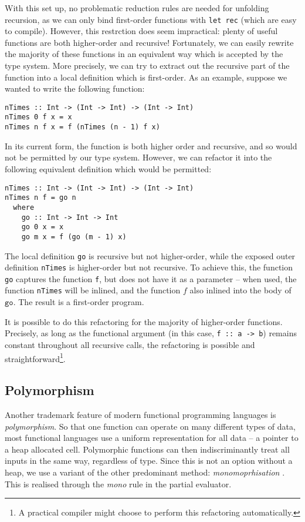 \documentclass[runningheads]{llncs}
\begin{document}
With this set up, no problematic reduction rules are needed for unfolding recursion, as we can only bind first-order functions with \texttt{let rec} (which are easy to compile). However, this restrction does seem impractical: plenty of useful functions are both higher-order and recursive! Fortunately, we can easily rewrite the majority of these functions in an equivalent way which is accepted by the type system. More precisely, we can try to extract out the recursive part of the function into a local definition which is first-order. As an example, suppose we wanted to write the following function:

\begin{verbatim}
nTimes :: Int -> (Int -> Int) -> (Int -> Int)
nTimes 0 f x = x
nTimes n f x = f (nTimes (n - 1) f x)
\end{verbatim}

In its current form, the function is both higher order and recursive, and so would not be permitted by our type system. However, we can refactor it into the following equivalent definition which would be permitted:

\begin{verbatim}
nTimes :: Int -> (Int -> Int) -> (Int -> Int)
nTimes n f = go n
  where
    go :: Int -> Int -> Int
    go 0 x = x
    go m x = f (go (m - 1) x)
\end{verbatim}

The local definition \texttt{go} is recursive but not higher-order, while the exposed outer definition \texttt{nTimes} is higher-order but not recursive. To achieve this, the function \texttt{go} captures the function \texttt{f}, but does not have it as a parameter -- when used, the function \texttt{nTimes} will be inlined, and the function $f$ also inlined into the body of $\texttt{go}$. The result is a first-order program.

It is possible to do this refactoring for the majority of higher-order functions. Precisely, as long as the functional argument (in this case, \texttt{f :: a -> b}) remains constant throughout all recursive calls, the refactoring is possible and straightforward\footnote{A practical compiler might choose to perform this refactoring automatically.}.

\subsection{Polymorphism} \label{sec:polymorphism}

Another trademark feature of modern functional programming languages is \emph{polymorphism}. So that one function can operate on many different types of data, most functional languages use a uniform representation for all data -- a pointer to a heap allocated cell. Polymorphic functions can then indiscriminantly treat all inputs in the same way, regardless of type. Since this is not an option without a heap, we use a variant of the other predominant method: \emph{monomoprhisation} \cite{lutze2025simple}. This is realised through the \textit{mono} rule in the partial evaluator.
\end{document}
